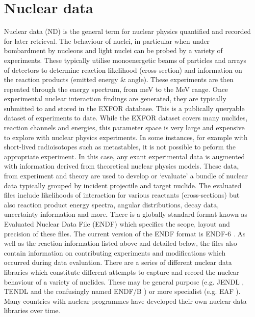 \section{Nuclear data}
Nuclear data (ND) is the general term for nuclear physics quantified and recorded for later retrieval. The behaviour of nuclei, in particular when under bombardment by nucleons and light nuclei can be probed by a variety of experiments. These typically utilise monoenergetic beams of particles and arrays of detectors to determine reaction likelihood (cross-section) and information on the reaction products (emitted energy \& angle). These experiments are then repeated through the energy spectrum, from meV to the MeV range. Once experimental nuclear interaction findings are generated, they are typically submitted to and stored in the EXFOR database. This is a publically queryable dataset of experiments to date. While the EXFOR dataset covers many nuclides, reaction channels and energies, this parameter space is very large and expensive to explore with nuclear physics experiments. In some instances, for example with short-lived radioisotopes such as metastables, it is not possible to peform the appropriate experiment. In this case, any exant experimental data is augmented with information derived from theoretical nuclear physics models. These data, from experiment and theory are used to develop or `evaluate' a bundle of nuclear data typically grouped by incident projectile and target nuclide. The evaluated files include likelihoods of interaction for various reactants (cross-sections) but also reaction product energy spectra, angular distributions, decay data, uncertainty information and more. There is a globally standard format known as Evaluated Nuclear Data File (ENDF)  which specifies the scope, layout and precision of these files. The current version of the ENDF format is ENDF-6 \cite{Herman2010}. As well as the reaction information listed above and detailed below, the files also contain information on contributing experiments and modifications which occurred during data evaluation. There are a series of different nuclear data libraries which constitute different attempts to capture and record the nuclear behaviour of a variety of nuclides. These may be general purpose (e.g. JENDL \cite{shibata2011},  TENDL \cite{Rochman2016}  and the confusingly named ENDF/B \cite{brown2018}) or more specialist (e.g. EAF\cite{packer2011} ). Many countries with nuclear programmes have developed their own nuclear data libraries over time. 

